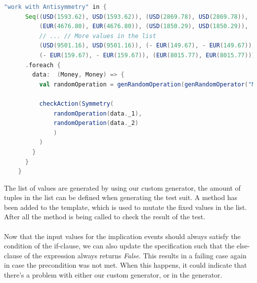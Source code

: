 \FloatBarrier
\begin{sourcecode}[!ht]
\begin{lstlisting}[language=Scala]
"work with Antisymmetry" in {
      Seq((USD(1593.62), USD(1593.62)), (USD(2869.78), USD(2869.78)),
          (EUR(4676.80), EUR(4676.80)), (USD(1850.29), USD(1850.29)),
          // ... // More values in the list
          (USD(9501.16), USD(9501.16)), (- EUR(149.67), - EUR(149.67)),
          (- EUR(159.67), - EUR(159.67)), (EUR(8015.77), EUR(8015.77)))
      .foreach {
        data:  (Money, Money) => {
          val randomOperation = genRandomOperation(genRandomOperator("Money", true), generateRandomMoney(data._1.currency), generateRandomInteger(true), generateRandomInteger(false), generateRandomPercentage(true), generateRandomPercentage(false), Random.nextInt(10))

          checkAction(Symmetry(
              randomOperation(data._1),
              randomOperation(data._2)
              )
          )
        }
      }
    }
\end{lstlisting}
\caption{Resulting test case with semi-random values. Omitted some input tuples for readability.}
\label{lst:experiment2_second_resulting_test}
\end{sourcecode}
\FloatBarrier
The list of values are generated by using our custom generator, the amount of tuples in the list can be defined when generating the test suit. A method  has been added to the template, which is used to mutate the fixed values in the list. After all the  method is being called to check the result of the test.\\
\\
Now that the input values for the implication events should always satisfy the condition of the if-clause, we can also update the specification such that the else-clause of the expression always returns \textit{False}. This results in a failing case again in case the precondition was not met. When this happens, it could indicate that there's a problem with either our custom generator, or in the generator.

